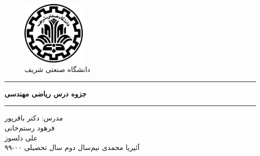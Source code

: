 \begin{center}
	\null
	\vspace{1cm}
\begin{figure}[H]
	\centering
	\includegraphics[width=0.275\textwidth]{sharif-logo-fa.png}
	\caption*{دانشگاه صنعتی شریف\\
		\large{
}
}
\end{figure}
\vspace{1cm}
\hrule
\vspace{.5cm}
\fontsize{26}{26}\textbf{
جزوه درس ریاضی مهندسی\\
}
\vspace{.5cm}
\hrule
\vspace{.5cm}
\vspace{1.5cm}
\normalfont
\Large{
مدرس:
دکتر باقرپور\\}
\vspace{1.5 cm}
\large{
	فرهود رستم‌‌خانی\\
	علی دلسوز\\
آئیریا محمدی
}
\normalsize
\vfill{نیم‌سال دوم سال تحصیلی ۰۰-۹۹}
\end{center}
\thispagestyle{empty}